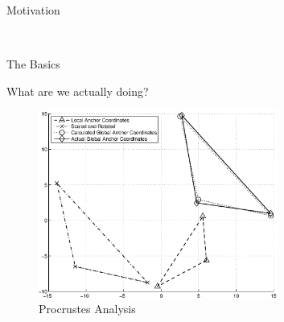 \documentclass{beamer}
\begin{document}
\begin{frame}{Motivation}
\begin{figure}
  \centering
	\\
\end{figure}
\end{frame}

\begin{frame}{The Basics}
\begin{block}{What are we actually doing?}
\begin{figure}
	\centering	
		\includegraphics[width=0.7\textwidth]{SampleAnchors}
		\caption{Procrustes Analysis}
\end{figure}
\end{block}
\end{frame}
\end{document}
